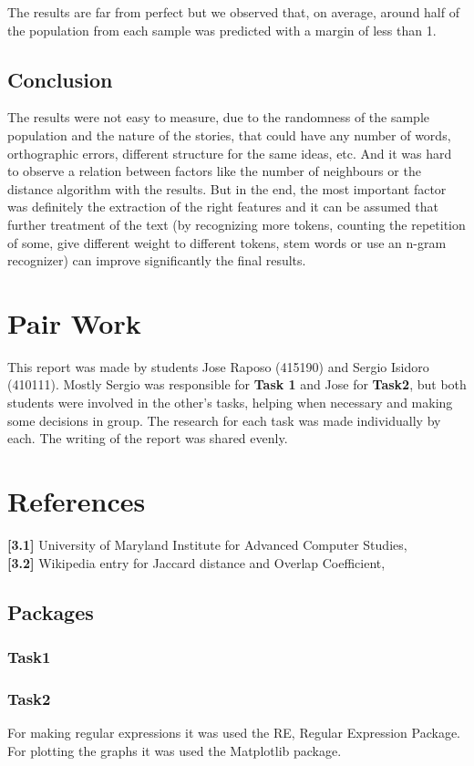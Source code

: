 \documentclass[a4paper,10pt]{article}
\begin{document}
The results are far from perfect but we observed that, on average, around half of the population from each sample was predicted with a margin of less than 1.

\subsection{Conclusion}
The results were not easy to measure, due to the randomness of the sample population and the nature of the stories, that could have any number of words, orthographic errors, different structure for the same ideas, etc. And it was hard to observe a relation between factors like the number of neighbours or the distance algorithm with the results. But in the end, the most important factor was definitely the extraction of the right features and it can be assumed that further treatment of the text (by recognizing more tokens, counting the repetition of some, give different weight to different tokens, stem words or use an n-gram recognizer) can improve significantly the final results.

\section{Pair Work}
This report was made by students Jose Raposo (415190) and Sergio Isidoro (410111). Mostly Sergio was responsible for \textbf{Task 1} and Jose for \textbf{Task2}, but both students were involved in the other's tasks, helping when necessary and making some decisions in group. The research for each task was made individually by each. The writing of the report was shared evenly.

\section{References}

\textbf{[3.1]}
University of Maryland Institute for Advanced Computer Studies, \\

\textbf{[3.2]}
Wikipedia entry for Jaccard distance and Overlap Coefficient, \\

\subsection{Packages}
\subsubsection{Task1}
\subsubsection{Task2}
For making regular expressions it was used the RE, Regular Expression Package.
For plotting the graphs it was used the Matplotlib package.
\end{document}
